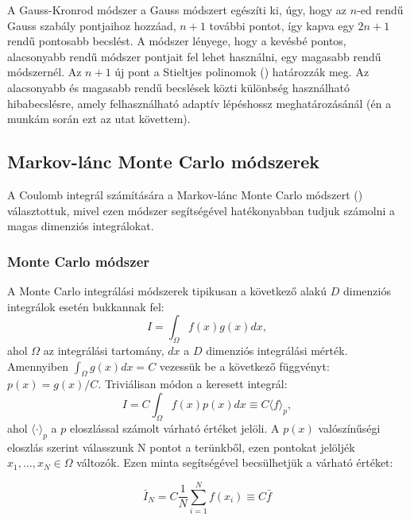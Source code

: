 \documentclass[11pt,a4paper]{article}
\numberwithin{equation}{subsection}
\numberwithin{figure}{section}
\begin{document}
A Gauss-Kronrod módszer a Gauss módszert egészíti ki, úgy, hogy az $n$-ed rendű Gauss szabály pontjaihoz hozzáad, $n+1$ további pontot, így kapva egy $2n+1$ rendű pontosabb becslést. A módszer lényege, hogy a kevésbé pontos, alacsonyabb rendű módszer pontjait fel lehet használni, egy magasabb rendű módszernél. Az $n+1$ új pont a Stieltjes polinomok (\cite{NIST:DLMF}) határozzák meg. Az alacsonyabb és magasabb rendű becslések közti különbség használható hibabecslésre, amely felhasználható adaptív lépéshossz meghatározásánál (én a munkám során ezt az utat követtem). 


\subsection{Markov-lánc Monte Carlo módszerek}

A Coulomb integrál számítására a Markov-lánc Monte Carlo módszert (\cite{mcbook}) választottuk, mivel ezen módszer segítségével hatékonyabban tudjuk számolni a magas dimenziós integrálokat.

\subsubsection{Monte Carlo módszer}

A Monte Carlo integrálási módszerek tipikusan a következő alakú  $D$ dimenziós integrálok esetén bukkannak fel:
\begin{equation}
I=\int_\Omega f(x)g(x) dx,
\end{equation}
ahol $\Omega$ az integrálási tartomány, $dx$ a $D$ dimenziós integrálási mérték. Amennyiben $\int_\Omega g(x)dx = C$ vezessük be a következő függvényt: $p(x)=g(x)/C$. Triviálisan módon a keresett integrál: 
\begin{equation}
I=C\int_\Omega f(x)p(x)dx \equiv C\langle f \rangle_p,
\end{equation}
ahol  $\langle \cdot \rangle_p$ a $p$ eloszlással számolt várható értéket jelöli.
A $p(x)$ valószínűségi eloszlás szerint válasszunk N pontot a terünkből, ezen pontokat jelöljék $x_1,\dots,x_N\in\Omega$ változók. Ezen minta segítségével becsülhetjük a várható értéket:

\begin{equation}
\bar{I}_N = C\frac{1}{N}\sum_{i=1}^N f(x_i)\equiv C\bar{f}
\label{eq:IN}
\end{equation} 
\end{document}
